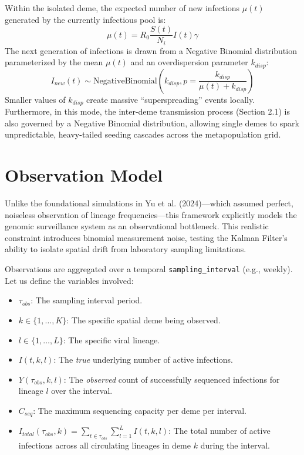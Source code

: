 \documentclass[12pt]{article}
\begin{document}
Within the isolated deme, the expected number of new infections $\mu(t)$ generated by the currently infectious pool is:
\begin{equation}
    \mu(t) = R_0 \frac{S(t)}{N_i} I(t) \gamma
\end{equation}
The next generation of infections is drawn from a Negative Binomial distribution parameterized by the mean $\mu(t)$ and an overdispersion parameter $k_{disp}$:
\begin{equation}
    I_{new}(t) \sim \text{NegativeBinomial}\left(k_{disp}, p = \frac{k_{disp}}{\mu(t) + k_{disp}}\right)
\end{equation}
Smaller values of $k_{disp}$ create massive ``superspreading'' events locally. Furthermore, in this mode, the inter-deme transmission process (Section 2.1) is also governed by a Negative Binomial distribution, allowing single demes to spark unpredictable, heavy-tailed seeding cascades across the metapopulation grid.

\section{Observation Model}
Unlike the foundational simulations in Yu et al. (2024)---which assumed perfect, noiseless observation of lineage frequencies---this framework explicitly models the genomic surveillance system as an observational bottleneck. This realistic constraint introduces binomial measurement noise, testing the Kalman Filter's ability to isolate spatial drift from laboratory sampling limitations.

Observations are aggregated over a temporal \texttt{sampling\_interval} (e.g., weekly). Let us define the variables involved:
\begin{itemize}
    \item $\tau_{obs}$: The sampling interval period.
    \item $k \in \{1, \dots, K\}$: The specific spatial deme being observed.
    \item $l \in \{1, \dots, L\}$: The specific viral lineage.
    \item $I(t, k, l)$: The \textit{true} underlying number of active infections.
    \item $Y(\tau_{obs}, k, l)$: The \textit{observed} count of successfully sequenced infections for lineage $l$ over the interval. 
    \item $C_{seq}$: The maximum sequencing capacity per deme per interval.
    \item $I_{total}(\tau_{obs}, k) = \sum_{t \in \tau_{obs}} \sum_{l=1}^{L} I(t, k, l)$: The total number of active infections across all circulating lineages in deme $k$ during the interval.
\end{itemize}
\end{document}
